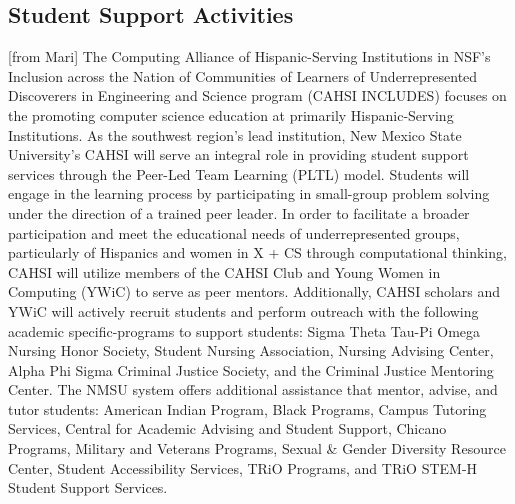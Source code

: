 
\subsection{Student Support Activities}

[from Mari] The Computing Alliance of Hispanic-Serving Institutions in NSF’s Inclusion across the Nation of Communities of Learners of Underrepresented Discoverers in Engineering and Science program (CAHSI INCLUDES) focuses on the promoting computer science education at primarily Hispanic-Serving Institutions. As the southwest region’s lead institution, New Mexico State University’s CAHSI will serve an integral role in providing student support services through the Peer-Led Team Learning (PLTL) model. Students will engage in the learning process by participating in small-group problem solving under the direction of a trained peer leader. In order to facilitate a broader participation and meet the educational needs of underrepresented groups, particularly of Hispanics and women in X + CS through computational thinking, CAHSI will utilize members of the CAHSI Club and Young Women in Computing (YWiC) to serve as peer mentors. Additionally, CAHSI scholars and YWiC will actively recruit students and perform outreach with the following academic specific-programs to support students: Sigma Theta Tau-Pi Omega Nursing Honor Society, Student Nursing Association, Nursing Advising Center, Alpha Phi Sigma Criminal Justice Society, and the Criminal Justice Mentoring Center. The NMSU system offers additional assistance that mentor, advise, and tutor students: American Indian Program, Black Programs, Campus Tutoring Services, Central for Academic Advising and Student Support, Chicano Programs, Military and Veterans Programs, Sexual \& Gender Diversity Resource Center, Student Accessibility Services, TRiO Programs, and TRiO STEM-H Student Support Services. 